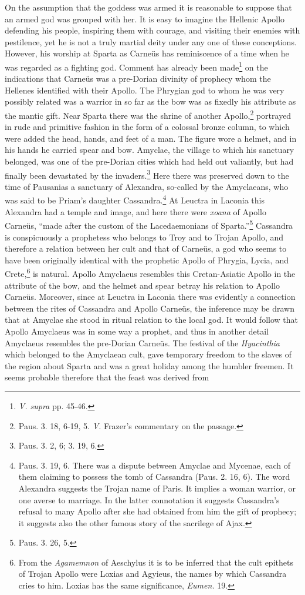 \documentclass[a4paper, 12pt, oneside]{article}
\begin{document}
On the assumption that the goddess was armed it is reasonable to suppose that an armed god was grouped with her. It is easy to imagine the Hellenic Apollo defending his people, inspiring them with courage, and visiting their enemies with pestilence, yet he is not a truly martial deity under any one of these conceptions. However, his worship at Sparta as Carneüs has reminiscence of a time when he was regarded as a fighting god. Comment has already been made\footnote{\emph{V. supra} pp. 45-46.} on the indications that Carneüs was a pre-Dorian divinity of prophecy whom the Hellenes identified with their Apollo. The Phrygian god to whom he was very possibly related was a warrior in so far as the bow was as fixedly his attribute as the mantic gift. Near Sparta there was the shrine of another Apollo,\footnote{Paus. 3. 18, 6-19, 5. \emph{V.} Frazer's commentary on the passage.} portrayed in rude and primitive fashion in the form of a colossal bronze column, to which were added the head, hands, and feet of a man. The figure wore a helmet, and in his hands he carried spear and bow. Amyclae, the village to which his sanctuary belonged, was one of the pre-Dorian cities which had held out valiantly, but had finally been devastated by the invaders.\footnote{Paus. 3. 2, 6; 3. 19, 6.} Here there was preserved down to the time of Pausanias a sanctuary of Alexandra, so-called by the Amyclaeans, who was said to be Priam's daughter Cassandra.\footnote{Paus. 3. 19, 6. There was a dispute between Amyclae and Mycenae, each of them claiming to possess the tomb of Cassandra (Paus. 2. 16, 6). The word Alexandra suggests the Trojan name of Paris. It implies a woman warrior, or one averse to marriage. In the latter connotation it suggests Cassandra's refusal to many Apollo after she had obtained from him the gift of prophecy; it suggests also the other famous story of the sacrilege of Ajax.} At Leuctra in Laconia this Alexandra had a temple and image, and here there were \emph{xoana} of Apollo Carneüs, ``made after the custom of the Lacedaemonians of Sparta.''\footnote{Paus. 3. 26, 5.} Cassandra is conspicuously a prophetess who belongs to Troy and to Trojan Apollo, and therefore a relation between her cult and that of Carneüs, a god who seems to have been originally identical with the prophetic Apollo of Phrygia, Lycia, and Crete,\footnote{From the \emph{Agamemnon} of Aeschylus it is to be inferred that the cult epithets of Trojan Apollo were Loxias and Agyieus, the names by which Cassandra cries to him. Loxias has the same significance, \emph{Eumen.} 19.} is natural. Apollo Amyclaeus resembles this Cretan-Asiatic Apollo in the attribute of the bow, and the helmet and spear betray his relation to Apollo Carneüs. Moreover, since at Leuctra in Laconia there was evidently a connection between the rites of Cassandra and Apollo Carneüs, the inference may be drawn that at Amyclae she stood in ritual relation to the local god. It would follow that Apollo Amyclaeus was in some way a prophet, and thus in another detail Amyclaeus resembles the pre-Dorian Carneüs. The festival of the \emph{Hyacinthia} which belonged to the Amyclaean cult, gave temporary freedom to the slaves of the region about Sparta and was a great holiday among the humbler freemen. It seems probable therefore that the feast was derived from 
\end{document}
